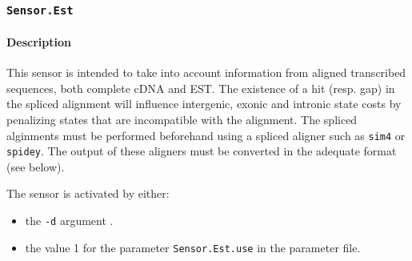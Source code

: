 
\subsubsection{\texttt{Sensor.Est}}
\label{plugest}

\paragraph{Description}

This sensor is intended to take into account information from aligned
transcribed sequences, both complete cDNA and EST. The existence of a
hit (resp. gap) in the spliced alignment will influence intergenic,
exonic and intronic state costs by penalizing states that are
incompatible with the alignment. The spliced alginments must be
performed beforehand using a spliced aligner such as \texttt{sim4} or
\texttt{spidey}. The output of these aligners must be converted in the
adequate format (see below).

The sensor is activated by either:
\begin{itemize}
\item the \texttt{-d} argument .
\item the value 1 for the parameter \texttt{Sensor.Est.use} in
  the parameter file.
\end{itemize}

